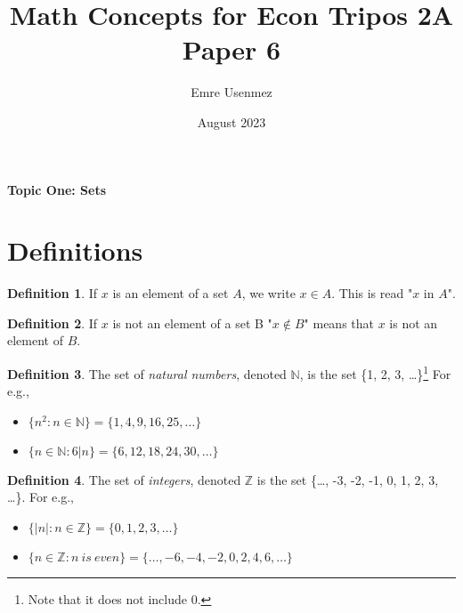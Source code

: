 \documentclass{amsart} %
\title{Math Concepts for Econ Tripos 2A Paper 6}
\author{Emre Usenmez}
\date{August 2023}
\theoremstyle{definition} %
\newtheorem*{dfn}{Definition} %
\theoremstyle{definition}
\theoremstyle{remark} %
\begin{document}


\begin{center}
      \textbf{Topic One: Sets}
\end{center}



\section{\textbf{Definitions}}


\begin{dfn}
\boxed{\in} \quad If $x$ is an element of a set $A$, we write $x \in A$. This is read "$x$ in $A$". %
\end{dfn}

\begin{dfn}
\boxed{\not\in} \quad If $x$ is not an element of a set B "$x \not\in B$" means that $x$ is not an element of $B$.
\end{dfn}

\begin{dfn}
 \quad The set of \emph{natural numbers}, denoted $\mathbb{N}$, is the set \{1, 2, 3, \dots\}\footnote{Note that it does not include 0.} For e.g.,
    \begin{itemize}
          \item $\{n^2:n \in \mathbb{N} \} = \{1, 4, 9, 16, 25, \dots\}$
          \item $\{n \in \mathbb{N} : 6|n\} = \{6, 12, 18, 24, 30, \dots\}$
    \end{itemize}
\end{dfn}

\begin{dfn}
 \quad The set of \emph{integers}, denoted $\mathbb{Z}$ is the set \{\dots, -3, -2, -1, 0, 1, 2, 3, \dots \}. For e.g.,
    \begin{itemize}
          \item $\{|n|:n \in \mathbb{Z} \} = \{0, 1, 2, 3, \dots\}$
          \item $\{n \in \mathbb{Z}: n\ is\ even\} = \{\dots, -6, -4, -2, 0, 2, 4, 6, \dots \}$ %
    \end{itemize}
\end{dfn}
\end{document}
